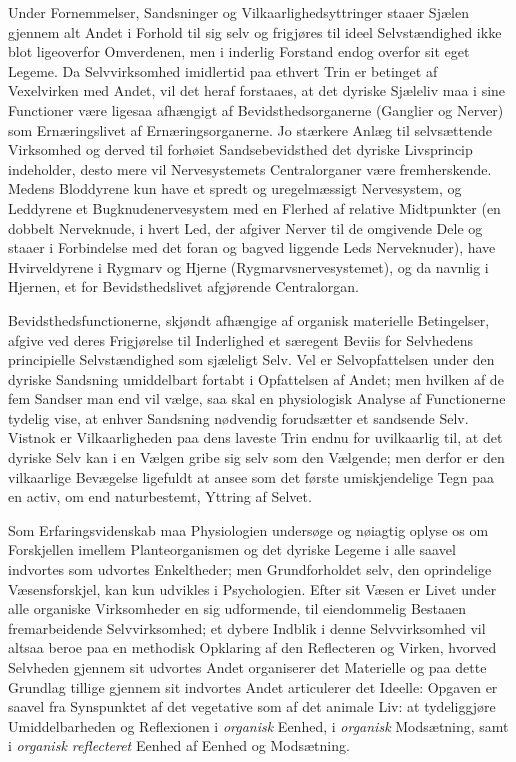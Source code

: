 \documentclass[11pt]{book}
\newcommand{\opage}[1]{\marginnote{\footnotesize\textit{[#1]}}}
\begin{document}
Under Fornemmelser, Sandsninger og Vilkaarlighedsyttringer staaer
Sjælen gjennem alt Andet i Forhold til sig selv og frigjøres til ideel
Selvstændighed ikke blot ligeoverfor Omverdenen, men i inderlig
Forstand endog overfor sit eget Legeme. Da Selvvirksomhed imidlertid
paa ethvert Trin er betinget af Vexelvirken med Andet, vil det heraf
forstaaes, at det dyriske Sjæleliv maa i sine Functioner være ligesaa
afhængigt af Bevidsthedsorganerne (Ganglier og Nerver) som
Ernæringslivet af Ernæringsorganerne. Jo stærkere Anlæg til
selvsættende Virksomhed og derved til forhøiet Sandsebevidsthed det
dyriske Livsprincip indeholder, desto mere vil Nervesystemets
Centralorganer være fremherskende. Medens Bloddyrene kun have et
spredt og uregelmæssigt Nervesystem, og Leddyrene et
Bugknudenervesystem med en Flerhed af relative Midtpunkter (en dobbelt
Nerveknude, i hvert Led, der afgiver Nerver til de omgivende Dele og
staaer i Forbindelse med det foran og bagved liggende Leds
Nerveknuder), have Hvirveldyrene i Rygmarv og Hjerne
(Rygmarvsnervesystemet), og da navnlig i Hjernen, et for
Bevidsthedslivet afgjørende Centralorgan.

Bevidsthedsfunctionerne, skjøndt afhængige af organisk materielle
Betingelser, afgive ved deres Frigjørelse til Inderlighed et særegent
Beviis for Selvhedens principielle Selvstændighed som sjæleligt Selv.
Vel er Selvopfattelsen under den dyriske Sandsning umiddelbart fortabt
i Opfattelsen af Andet; men hvilken af de fem Sandser man end vil
vælge, saa skal en physiologisk Analyse af Functionerne tydelig vise,
at enhver Sandsning nødvendig forudsætter et sandsende Selv. Vistnok
er Vilkaarligheden paa dens laveste Trin endnu for
\opage{271} \setcounter{footnote}{0}%
uvilkaarlig til, at
det dyriske Selv kan i en Vælgen gribe sig selv som den Vælgende; men
derfor er den vilkaarlige Bevægelse ligefuldt at ansee som det første
umiskjendelige Tegn paa en activ, om end naturbestemt, Yttring af
Selvet.

Som Erfaringsvidenskab maa Physiologien undersøge og nøiagtig
oplyse os om Forskjellen imellem Planteorganismen og det dyriske
Legeme i alle saavel indvortes som udvortes Enkeltheder; men
Grundforholdet selv, den oprindelige Væsensforskjel, kan kun udvikles
i Psychologien. Efter sit Væsen er Livet under alle organiske
Virksomheder en sig udformende, til eiendommelig Bestaaen
fremarbeidende Selvvirksomhed; et dybere Indblik i denne
Selvvirksomhed vil altsaa beroe paa en methodisk Opklaring af den
Reflecteren og Virken, hvorved Selvheden gjennem sit udvortes Andet
organiserer det Materielle og paa dette Grundlag tillige gjennem sit
indvortes Andet articulerer det Ideelle: Opgaven er saavel fra
Synspunktet af det vegetative som af det animale Liv: at
tydeliggjøre Umiddelbarheden og Reflexionen i \emph{organisk} Eenhed,
i \emph{organisk} Modsætning, samt i \emph{organisk reflecteret}
Eenhed af Eenhed og Modsætning.
\end{document}
